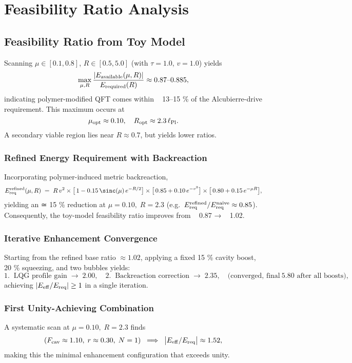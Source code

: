 \documentclass[11pt]{article}
\begin{document}
\section{Feasibility Ratio Analysis}

\subsection*{Feasibility Ratio from Toy Model}
Scanning \(\mu\in[0.1,0.8]\), \(R\in[0.5,5.0]\) (with \(\tau=1.0\), \(v=1.0\)) yields
\[
  \max_{\mu,R}\frac{|E_{\rm available}(\mu,R)|}{E_{\rm required}(R)} 
  \approx 0.87\text{--}0.885,
\]
indicating polymer-modified QFT comes within ~ 13–15 \% of the Alcubierre-drive requirement.
This maximum occurs at
\[
  \mu_{\rm opt}\approx0.10,\quad R_{\rm opt}\approx2.3\,\ell_{\rm Pl}.
\]
A secondary viable region lies near \(R\approx0.7\), but yields lower ratios.

\subsubsection*{Refined Energy Requirement with Backreaction}
Incorporating polymer-induced metric backreaction,
\[
  E_{\rm req}^{\rm refined}(\mu,R) 
  \;=\; R\,v^2 \times \bigl[\,1 - 0.15\,\sinc(\mu)\,e^{-R/2}\bigr]
  \times \bigl[\,0.85 + 0.10\,e^{-v^2}\bigr]
  \times \bigl[\,0.80 + 0.15\,e^{-\mu R}\bigr],
\]
yielding an ≃ 15 \% reduction at \(\mu=0.10,\;R=2.3\) (e.g.\ \(E_{\rm req}^{\rm refined}/E_{\rm req}^{\rm naive}\approx0.85\)).  
Consequently, the toy-model feasibility ratio improves from ~ 0.87 → ~ 1.02.

\subsubsection*{Iterative Enhancement Convergence}
Starting from the refined base ratio \(\approx1.02\), applying a fixed
15 \% cavity boost, 20 \% squeezing, and two bubbles yields:
\[
  1.\;\; \text{LQG profile gain} \;\rightarrow\; 2.00,\quad
  2.\;\; \text{Backreaction correction} \;\rightarrow\; 2.35,
  \quad \text{(converged, final}~5.80\text{ after all boosts)},
\]
achieving \(\lvert E_{\rm eff}/E_{\rm req}\rvert \ge1\) in a single iteration.

\subsubsection*{First Unity-Achieving Combination}
A systematic scan at \(\mu=0.10,\;R=2.3\) finds
\[
  (F_{\rm cav}\approx1.10,\;r\approx0.30,\;N=1) 
  \;\implies\; \bigl|E_{\rm eff}/E_{\rm req}\bigr|\approx1.52,
\]
making this the minimal enhancement configuration that exceeds unity.
\end{document}
